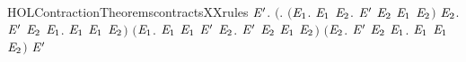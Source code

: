 \newcommand{\HOLContractionTheoremscontractsXXreflexive}{\UseVerbatim{HOLContractionTheoremscontractsXXreflexive}}
\begin{SaveVerbatim}{HOLContractionTheoremscontractsXXrules}
\HOLTokenTurnstile{} \HOLSymConst{\HOLTokenForall{}} \ensuremath{\HOLBoundVar{E}\sp{\prime{}}}.
     \ensuremath{(}\HOLSymConst{\HOLTokenForall{}}. \ensuremath{(}\HOLSymConst{\HOLTokenForall{}}\ensuremath{\HOLBoundVar{E}\sb{\mathrm{1}}}.
              \HOLTokenTransBegin{} \HOLTokenTransEnd \ensuremath{\HOLBoundVar{E}\sb{\mathrm{1}}} \HOLSymConst{\HOLTokenImp{}}
             \HOLSymConst{\HOLTokenExists{}}\ensuremath{\HOLBoundVar{E}\sb{\mathrm{2}}}. \ensuremath{\HOLBoundVar{E}\sp{\prime{}}} \HOLTokenTransBegin{} \HOLTokenTransEnd \ensuremath{\HOLBoundVar{E}\sb{\mathrm{2}}} \HOLSymConst{\HOLTokenConj{}} \ensuremath{\HOLBoundVar{E}\sb{\mathrm{1}}}  \ensuremath{\HOLBoundVar{E}\sb{\mathrm{2}}}\ensuremath{)} \HOLSymConst{\HOLTokenConj{}}
          \HOLSymConst{\HOLTokenForall{}}\ensuremath{\HOLBoundVar{E}\sb{\mathrm{2}}}.
            \ensuremath{\HOLBoundVar{E}\sp{\prime{}}} \HOLTokenTransBegin{} \HOLTokenTransEnd \ensuremath{\HOLBoundVar{E}\sb{\mathrm{2}}} \HOLSymConst{\HOLTokenImp{}}
            \HOLSymConst{\HOLTokenExists{}}\ensuremath{\HOLBoundVar{E}\sb{\mathrm{1}}}.  \HOLTokenWeakTransBegin{} \HOLTokenWeakTransEnd \ensuremath{\HOLBoundVar{E}\sb{\mathrm{1}}} \HOLSymConst{\HOLTokenConj{}}  \ensuremath{\HOLBoundVar{E}\sb{\mathrm{1}}} \ensuremath{\HOLBoundVar{E}\sb{\mathrm{2}}}\ensuremath{)} \HOLSymConst{\HOLTokenConj{}}
     \ensuremath{(}\HOLSymConst{\HOLTokenForall{}}\ensuremath{\HOLBoundVar{E}\sb{\mathrm{1}}}.
         \HOLTokenTransBegin\HOLConst{\ensuremath{\tau}}\HOLTokenTransEnd \ensuremath{\HOLBoundVar{E}\sb{\mathrm{1}}} \HOLSymConst{\HOLTokenImp{}}
        \ensuremath{\HOLBoundVar{E}\sb{\mathrm{1}}}  \ensuremath{\HOLBoundVar{E}\sp{\prime{}}} \HOLSymConst{\HOLTokenDisj{}} \HOLSymConst{\HOLTokenExists{}}\ensuremath{\HOLBoundVar{E}\sb{\mathrm{2}}}. \ensuremath{\HOLBoundVar{E}\sp{\prime{}}} \HOLTokenTransBegin\HOLConst{\ensuremath{\tau}}\HOLTokenTransEnd \ensuremath{\HOLBoundVar{E}\sb{\mathrm{2}}} \HOLSymConst{\HOLTokenConj{}} \ensuremath{\HOLBoundVar{E}\sb{\mathrm{1}}}  \ensuremath{\HOLBoundVar{E}\sb{\mathrm{2}}}\ensuremath{)} \HOLSymConst{\HOLTokenConj{}}
     \ensuremath{(}\HOLSymConst{\HOLTokenForall{}}\ensuremath{\HOLBoundVar{E}\sb{\mathrm{2}}}. \ensuremath{\HOLBoundVar{E}\sp{\prime{}}} \HOLTokenTransBegin\HOLConst{\ensuremath{\tau}}\HOLTokenTransEnd \ensuremath{\HOLBoundVar{E}\sb{\mathrm{2}}} \HOLSymConst{\HOLTokenImp{}} \HOLSymConst{\HOLTokenExists{}}\ensuremath{\HOLBoundVar{E}\sb{\mathrm{1}}}.   \ensuremath{\HOLBoundVar{E}\sb{\mathrm{1}}} \HOLSymConst{\HOLTokenConj{}}  \ensuremath{\HOLBoundVar{E}\sb{\mathrm{1}}} \ensuremath{\HOLBoundVar{E}\sb{\mathrm{2}}}\ensuremath{)} \HOLSymConst{\HOLTokenImp{}}
       \ensuremath{\HOLBoundVar{E}\sp{\prime{}}}
\end{SaveVerbatim}
